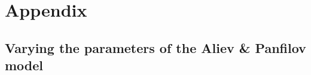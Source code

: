 \appendix
\section{Appendix}
\subsection{Varying the parameters of the Aliev \& Panfilov model}
\label{app:ap-params}

